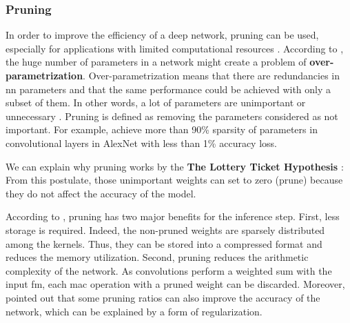 \subsubsection{Pruning} \label{subs:pruning}
In order to improve the efficiency of a deep network, pruning can be used, especially for applications with limited computational resources \cite{liu_rethinking_2019}. According to \textcite{denton_exploiting_2014, liu_rethinking_2019}, the huge number of parameters in a network might create a problem of \textbf{over-parametrization}. Over-parametrization means that there are redundancies in \acrshort{nn} parameters and that the same performance could be achieved with only a subset of them. In other words, a lot of parameters are unimportant or unnecessary \cite{cheng_recent_2018}. Pruning is defined as removing the parameters considered as not important. For example, \textcite{baoyuan_liu_sparse_2015} achieve more than 90\% sparsity of parameters in convolutional layers in AlexNet with less than 1\% accuracy loss.

We can explain why pruning works by the \textbf{The Lottery Ticket Hypothesis} \cite{frankle_lottery_2018, frankle_early_2020}:  From this postulate, those unimportant weights can set to zero (prune) because they do not affect the accuracy of the model.

According to \textcite{cheng_recent_2018}, pruning has two major benefits for the inference step. First, less storage is required. Indeed, the non-pruned weights are sparsely distributed among the kernels. Thus, they can be stored into a compressed format and reduces the memory utilization. Second, pruning reduces the arithmetic complexity of the network. As convolutions perform a weighted sum with the input \acrshort{fm}, each \acrfull{mac} operation with a pruned weight can be discarded. Moreover, \textcite{han_learning_2015, mao_exploring_2017, kang_accelerator-aware_2020} pointed out that some pruning ratios can also improve the accuracy of the network, which can be explained by a form of regularization.

